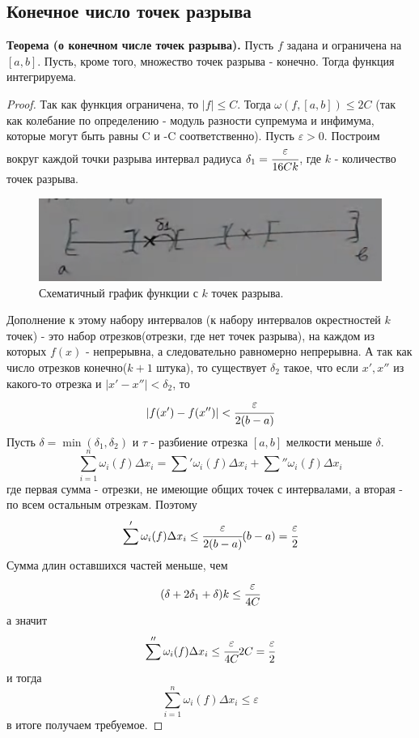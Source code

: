 \documentclass{article}
\newcommand*{\theorem}[2]{\textbf{Теорема #1. } #2 \newline}
\newcommand*{\eps}{\varepsilon}
\begin{document}
\subsection{Конечное число точек разрыва}
\theorem{(о конечном числе точек разрыва)}{Пусть $f$ задана и ограничена на $[a, b]$. Пусть, кроме того, множество точек разрыва - конечно. Тогда функция интегрируема.}
\begin{proof}
    Так как функция ограничена, то $|f| \leq C$. Тогда $\omega(f, [a, b]) \leq 2C$ (так как колебание по определению - модуль разности супремума и инфимума, которые могут быть равны C и -C соответственно). Пусть $\eps > 0$. Построим вокруг каждой точки разрыва интервал радиуса $\delta_1 = \cfrac{\eps}{16Ck}$, где $k$ - количество точек разрыва.
    \begin{figure}[!ht]
        \begin{center}
        \includegraphics[scale=0.6]{graphic_scheme.png}\caption{Схематичный график функции с $k$ точек разрыва.}\label{Схематичный график функции с $k$ точек разрыва.}
        \end{center}
    \end{figure}
    Дополнение к этому набору интервалов (к набору интервалов окрестностей $k$ точек) - это набор отрезков(отрезки, где нет точек разрыва), на каждом из которых $f(x)$ - непрерывна, а следовательно равномерно непрерывна. А так как число отрезков конечно($k + 1$ штука), то существует $\delta_2$ такое, что если $x', x''$ из какого-то отрезка и $|x' - x''| < \delta_2$, то
    $$
        |f(x') - f(x'')| < \cfrac{\eps}{2(b - a)}
    $$
    Пусть $\delta = \min(\delta_1, \delta_2)$ и $\tau$ - разбиение отрезка $[a, b]$ мелкости меньше $\delta$.
    $$
        \sum_{i = 1}^{n} \omega_i(f)\Delta x_i = \sum'\omega_i(f)\Delta x_i + \sum''\omega_i(f)\Delta x_i
    $$
    где первая сумма - отрезки, не имеющие общих точек с интервалами, а вторая - по всем остальным отрезкам. Поэтому
    $$
        \sum'\omega_i(f)\Delta x_i \leq \cfrac{\eps}{2(b-a)}(b-a) = \cfrac{\eps}{2}
    $$
    Сумма длин оставшихся частей меньше, чем 
    $$
        (\delta + 2\delta_1 + \delta)k \leq \cfrac{\eps}{4C}
    $$
    а значит 
    $$
        \sum''\omega_i(f)\Delta x_i \leq \cfrac{\eps}{4C}2C = \cfrac{\eps}{2}
    $$
    и тогда 
    $$
        \sum_{i = 1}^{n} \omega_i(f)\Delta x_i \leq \eps
    $$
    в итоге получаем требуемое.
\end{proof}
\end{document}
